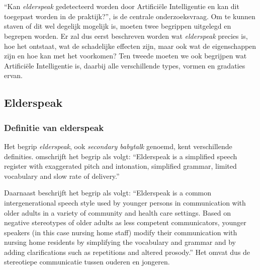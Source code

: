 \chapter{}
\label{ch:stand-van-zaken}



``Kan \textit{elderspeak} gedetecteerd worden door Artificiële Intelligentie en kan dit toegepast worden in de praktijk?'', is de centrale onderzoeksvraag.
Om te kunnen staven of dit wel degelijk mogelijk is, moeten twee begrippen uitgelegd en begrepen worden.
Er zal dus eerst beschreven worden wat \textit{elderspeak} precies is, hoe het ontstaat, wat de schadelijke effecten zijn, maar ook wat de eigenschappen zijn en hoe kan met het voorkomen?
Ten tweede moeten we ook begrijpen wat Artificiële Intelligentie is, daarbij alle verschillende types, vormen en gradaties ervan.

\section{Elderspeak}

\subsection{Definitie van elderspeak}

Het begrip \textit{elderspeak}, ook \textit{secondary babytalk} genoemd, kent verschillende definities. \textcite{Kemper1998} omschrijft het begrip als volgt:
``Elderspeak is a simplified speech register with exaggerated pitch and intonation, simplified grammar, limited vocabulary and slow rate of delivery.''

Daarnaast beschrijft \textcite{Williams2011} het begrip als volgt:
``Elderspeak is a common intergenerational speech style used by younger persons in communication with older adults in a variety of community and health care settings. Based on negative stereotypes of older adults as less competent communicators, younger speakers (in this case nursing home staff) modify their communication with nursing home residents by simplifying the vocabulary and grammar and by adding clarifications such as repetitions and altered prosody.'' Het omvat dus de stereotiepe communicatie tussen ouderen en jongeren.

